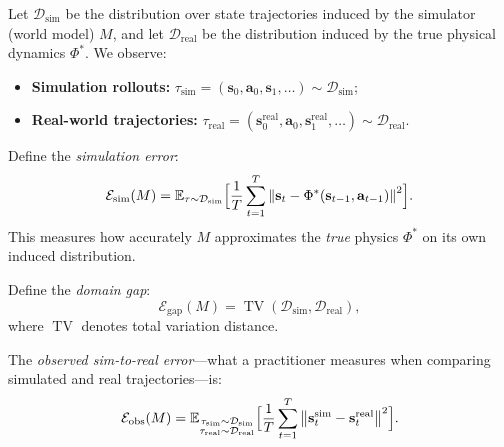 \documentclass[11pt,twocolumn]{article}
\theoremstyle{definition}
\DeclareMathOperator{\TV}{TV}
\newcommand{\E}{\mathbb{E}}
\newcommand{\cD}{\mathcal{D}}
\newcommand{\norm}[1]{\left\lVert#1\right\rVert}
\begin{document}
Let $\cD_{\text{sim}}$ be the distribution over state trajectories induced by
the simulator (world model) $M$, and let $\cD_{\text{real}}$ be the
distribution induced by the true physical dynamics $\Phi^*$.  We observe:
\begin{itemize}[nosep]
  \item \textbf{Simulation rollouts:} $\tau_{\text{sim}} = (\mathbf{s}_0,
    \mathbf{a}_0, \mathbf{s}_1, \dots) \sim \cD_{\text{sim}}$;
  \item \textbf{Real-world trajectories:} $\tau_{\text{real}} =
    (\mathbf{s}_0^{\text{real}}, \mathbf{a}_0, \mathbf{s}_1^{\text{real}},
    \dots) \sim \cD_{\text{real}}$.
\end{itemize}

Define the \emph{simulation error}:
\begin{equation}
  \mathcal{E}_{\text{sim}}(M) =
  \E_{\tau \sim \cD_{\text{sim}}}\Bigl[
    \frac{1}{T}\sum_{t=1}^{T} \norm{\mathbf{s}_t - \Phi^*(\mathbf{s}_{t-1},
    \mathbf{a}_{t-1})}^2
  \Bigr].
\end{equation}
This measures how accurately $M$ approximates the \emph{true} physics
$\Phi^*$ on its own induced distribution.

Define the \emph{domain gap}:
\begin{equation}
  \mathcal{E}_{\text{gap}}(M) =
  \TV(\cD_{\text{sim}}, \cD_{\text{real}}),
\end{equation}
where $\TV$ denotes total variation distance.

The \emph{observed sim-to-real error}---what a practitioner measures when
comparing simulated and real trajectories---is:
\begin{equation}\label{eq:observed}
  \mathcal{E}_{\text{obs}}(M) =
  \E_{\substack{\tau_{\text{sim}} \sim \cD_{\text{sim}} \\
                 \tau_{\text{real}} \sim \cD_{\text{real}}}}
  \Bigl[ \frac{1}{T}\sum_{t=1}^{T}
    \norm{\mathbf{s}_t^{\text{sim}} - \mathbf{s}_t^{\text{real}}}^2
  \Bigr].
\end{equation}
\end{document}
